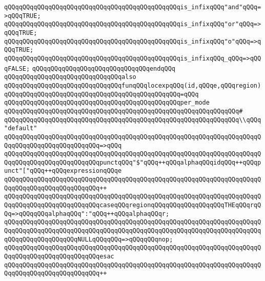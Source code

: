 \verb|qQQqqQQqqQQqqQQqqQQqqQQqqQQqqQQqqQQqqQQqqQQqqQQqis_infixqQQq"and"qQQq=>qQQqTRUE;|\newline
\verb|qQQqqQQqqQQqqQQqqQQqqQQqqQQqqQQqqQQqqQQqqQQqqQQqis_infixqQQq"or"qQQq=>qQQqTRUE;|\newline
\verb|qQQqqQQqqQQqqQQqqQQqqQQqqQQqqQQqqQQqqQQqqQQqqQQqis_infixqQQq"o"qQQq=>qQQqTRUE;|\newline
\verb|qQQqqQQqqQQqqQQqqQQqqQQqqQQqqQQqqQQqqQQqqQQqqQQqis_infixqQQq_qQQq=>qQQqFALSE;|\newline
\verb|qQQqqQQqqQQqqQQqqQQqqQQqqQQqqQQqendqQQq|\newline
\newline
\verb|qQQqqQQqqQQqqQQqqQQqqQQqqQQqqQQqalso|\newline
\verb|qQQqqQQqqQQqqQQqqQQqqQQqqQQqqQQqfunqQQqlocexpqQQq(id,qQQqe,qQQqregion)|\newline
\verb|qQQqqQQqqQQqqQQqqQQqqQQqqQQqqQQqqQQqqQQqqQQqqQQq=qQQq|\newline
\verb|qQQqqQQqqQQqqQQqqQQqqQQqqQQqqQQqqQQqqQQqqQQqqQQqper_mode|\newline
\verb|qQQqqQQqqQQqqQQqqQQqqQQqqQQqqQQqqQQqqQQqqQQqqQQqqQQqqQQqqQQqqQQq#|\newline
\verb|qQQqqQQqqQQqqQQqqQQqqQQqqQQqqQQqqQQqqQQqqQQqqQQqqQQqqQQqqQQqqQQq\\qQQq"default"|\newline
\verb|qQQqqQQqqQQqqQQqqQQqqQQqqQQqqQQqqQQqqQQqqQQqqQQqqQQqqQQqqQQqqQQqqQQqqQQqqQQqqQQqqQQqqQQqqQQqqQQq=>qQQq|\newline
\verb|qQQqqQQqqQQqqQQqqQQqqQQqqQQqqQQqqQQqqQQqqQQqqQQqqQQqqQQqqQQqqQQqqQQqqQQqqQQqqQQqqQQqqQQqqQQqqQQqpunctqQQq"$"qQQq++qQQqalphaqQQqidqQQq++qQQqpunct"["qQQq++qQQqexpressionqQQqe|\newline
\verb|qQQqqQQqqQQqqQQqqQQqqQQqqQQqqQQqqQQqqQQqqQQqqQQqqQQqqQQqqQQqqQQqqQQqqQQqqQQqqQQqqQQqqQQqqQQqqQQq++|\newline
\verb|qQQqqQQqqQQqqQQqqQQqqQQqqQQqqQQqqQQqqQQqqQQqqQQqqQQqqQQqqQQqqQQqqQQqqQQqqQQqqQQqqQQqqQQqqQQqqQQqcaseqQQqregionqQQqqQQqqQQqqQQqqQQqTHEqQQqrqQQq=>qQQqqQQqalphaqQQq":"qQQq++qQQqalphaqQQqr;|\newline
\verb|qQQqqQQqqQQqqQQqqQQqqQQqqQQqqQQqqQQqqQQqqQQqqQQqqQQqqQQqqQQqqQQqqQQqqQQqqQQqqQQqqQQqqQQqqQQqqQQqqQQqqQQqqQQqqQQqqQQqqQQqqQQqqQQqqQQqqQQqqQQqqQQqqQQqqQQqqQQqqQQqNULLqQQqqQQq=>qQQqqQQqnop;|\newline
\verb|qQQqqQQqqQQqqQQqqQQqqQQqqQQqqQQqqQQqqQQqqQQqqQQqqQQqqQQqqQQqqQQqqQQqqQQqqQQqqQQqqQQqqQQqqQQqqQQqesac|\newline
\verb|qQQqqQQqqQQqqQQqqQQqqQQqqQQqqQQqqQQqqQQqqQQqqQQqqQQqqQQqqQQqqQQqqQQqqQQqqQQqqQQqqQQqqQQqqQQqqQQq++|\newline
